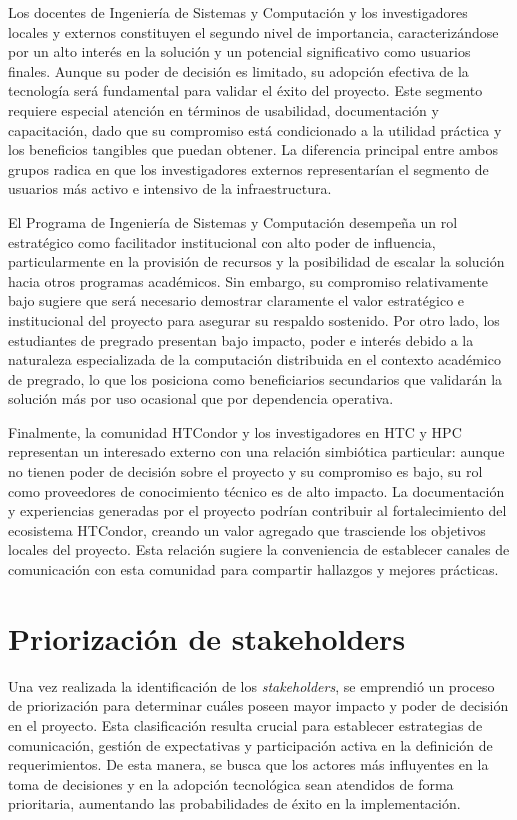 Los docentes de Ingeniería de Sistemas y Computación y los investigadores locales y externos constituyen el segundo nivel de importancia, caracterizándose por un alto interés en la solución y un potencial significativo como usuarios finales. Aunque su poder de decisión es limitado, su adopción efectiva de la tecnología será fundamental para validar el éxito del proyecto. Este segmento requiere especial atención en términos de usabilidad, documentación y capacitación, dado que su compromiso está condicionado a la utilidad práctica y los beneficios tangibles que puedan obtener. La diferencia principal entre ambos grupos radica en que los investigadores externos representarían el segmento de usuarios más activo e intensivo de la infraestructura.

El Programa de Ingeniería de Sistemas y Computación desempeña un rol estratégico como facilitador institucional con alto poder de influencia, particularmente en la provisión de recursos y la posibilidad de escalar la solución hacia otros programas académicos. Sin embargo, su compromiso relativamente bajo sugiere que será necesario demostrar claramente el valor estratégico e institucional del proyecto para asegurar su respaldo sostenido. Por otro lado, los estudiantes de pregrado presentan bajo impacto, poder e interés debido a la naturaleza especializada de la computación distribuida en el contexto académico de pregrado, lo que los posiciona como beneficiarios secundarios que validarán la solución más por uso ocasional que por dependencia operativa.

Finalmente, la comunidad HTCondor y los investigadores en HTC y HPC representan un interesado externo con una relación simbiótica particular: aunque no tienen poder de decisión sobre el proyecto y su compromiso es bajo, su rol como proveedores de conocimiento técnico es de alto impacto. La documentación y experiencias generadas por el proyecto podrían contribuir al fortalecimiento del ecosistema HTCondor, creando un valor agregado que trasciende los objetivos locales del proyecto. Esta relación sugiere la conveniencia de establecer canales de comunicación con esta comunidad para compartir hallazgos y mejores prácticas.



\section{Priorización de stakeholders}
Una vez realizada la identificación de los \textit{stakeholders}, se emprendió un proceso de priorización para determinar cuáles poseen mayor impacto y poder de decisión en el proyecto. Esta clasificación resulta crucial para establecer estrategias de comunicación, gestión de expectativas y participación activa en la definición de requerimientos. De esta manera, se busca que los actores más influyentes en la toma de decisiones y en la adopción tecnológica sean atendidos de forma prioritaria, aumentando las probabilidades de éxito en la implementación.

